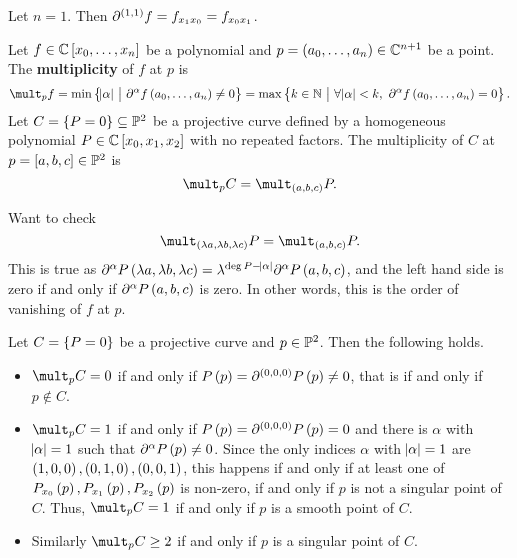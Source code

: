\begin{example*}
Let $ n = 1 $. Then $ \partial^{\br{1, 1}} f = f_{x_1x_0} = f_{x_0x_1} $.
\end{example*}

\begin{definition}
Let $ f \in \CC\sbr{x_0, \dots, x_n} $ be a polynomial and $ p = \br{a_0, \dots, a_n} \in \CC^{n + 1} $ be a point. The \textbf{multiplicity} of $ f $ at $ p $ is
$$ \mult_p f = \min\cbr{\abs{\alpha} \st \partial^\alpha f\br{a_0, \dots, a_n} \ne 0} = \max\cbr{k \in \NN \st \forall \abs{\alpha} < k, \ \partial^\alpha f\br{a_0, \dots, a_n} = 0}. $$
Let $ C = \cbr{P = 0} \subseteq \PP^2 $ be a projective curve defined by a homogeneous polynomial $ P \in \CC\sbr{x_0, x_1, x_2} $ with no repeated factors. The multiplicity of $ C $ at $ p = \sbr{a, b, c} \in \PP^2 $ is
$$ \mult_p C = \mult_{\br{a, b, c}} P. $$
\end{definition}

Want to check
$$ \mult_{\br{\lambda a, \lambda b, \lambda c}} P = \mult_{\br{a, b, c}} P. $$
This is true as $ \partial^\alpha P\br{\lambda a, \lambda b, \lambda c} = \lambda^{\deg P - \abs{\alpha}}\partial^\alpha P\br{a, b, c} $, and the left hand side is zero if and only if $ \partial^\alpha P\br{a, b, c} $ is zero. In other words, this is the order of vanishing of $ f $ at $ p $.


Let $ C = \cbr{P = 0} $ be a projective curve and $ p \in \mathbb{P}^2 $. Then the following holds.
\begin{itemize}
\item $ \mult_p C = 0 $ if and only if $ P\br{p} = \partial^{\br{0, 0, 0}} P\br{p} \ne 0 $, that is if and only if $ p \notin C $.
\item $ \mult_p C = 1 $ if and only if $ P\br{p} = \partial^{\br{0, 0, 0}} P\br{p} = 0 $ and there is $ \alpha $ with $ \abs{\alpha} = 1 $ such that $ \partial^{\alpha} P\br{p} \ne 0 $. Since the only indices $ \alpha $ with $ \abs{\alpha} = 1 $ are $ \br{1, 0, 0}, \br{0, 1, 0}, \br{0, 0, 1} $, this happens if and only if at least one of $ P_{x_0}\br{p}, P_{x_1}\br{p}, P_{x_2}\br{p} $ is non-zero, if and only if $ p $ is not a singular point of $ C $. Thus, $ \mult_p C = 1 $ if and only if $ p $ is a smooth point of $ C $.
\item Similarly $ \mult_p C \ge 2 $ if and only if $ p $ is a singular point of $ C $.
\end{itemize}

